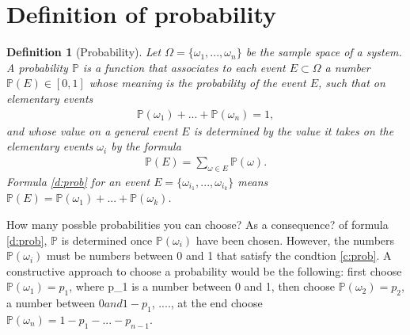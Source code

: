 \documentclass[reqno]{amsart}
\newtheorem{definition}[theorem]{Definition}
\newcommand{\<}{{\langle \!\! \langle}}
\renewcommand{\>}{{\rangle \!\! \rangle}}
\newcommand{\bel}[2]{\begin{equation} \label{#1} \begin{split} #2
 					\end{split} \end{equation}}
\newcommand{\commento}[1]{
	\par\noindent
	\colorbox{light}{\begin{minipage}{120 mm}#1\end{minipage}}
	\par\noindent
}
\begin{document}
\section{Definition of probability}


\begin{definition}[Probability]
Let $\Omega=\{\omega_1,...,\omega_n\}$ be the sample space of a system. A probability $\mathbb{P}$ is a function that associates to each event $E\subset \Omega$ a number $\mathbb{P}(E)\in[0,1]$ whose meaning is the probability of the event $E$, such that on elementary events 
\bel{c:prob}{\mathbb{P}(\omega_1)+...+\mathbb{P}(\omega_n)=1, }
and whose value on a general event $E$ is determined by the value it takes on the elementary events $\omega_i$ by the formula 
\bel{d:prob}{\mathbb{P}(E)=\sum_{\omega\in E }\mathbb{P}(\omega).}
Formula \eqref{d:prob} for an event $E=\{\omega_{i_1},...,\omega_{i_k}\}$ means $\mathbb{P}(E)=\mathbb{P}(\omega_1)+...+\mathbb{P}(\omega_k)$. 
\end{definition}

\commento{How many possble probabilities you can choose? As a consequence? of formula \eqref{d:prob}, $\mathbb{P}$ is determined  once $\mathbb{P}(\omega_i)$ have been chosen. However, the numbers $\mathbb{P}(\omega_i)$ must be numbers between 0 and 1 that satisfy the condtion \eqref{c:prob}. A constructive approach to choose a probability would be the following: first choose $\mathbb{P}(\omega_1)=p_1$, where p_1 is a number between 0 and 1, then choose $\mathbb{P}(\omega_2)=p_2$, a number between $0 and 1-p_1$, ...., at the end choose $\mathbb{P}(\omega_n)=1-p_1-...-p_{n-1}$. }
\end{document}
